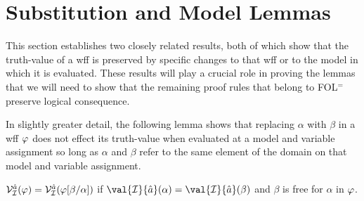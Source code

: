 \section{Substitution and Model Lemmas}%
  \label{sec:Lemmas}

This section establishes two closely related results, both of which show that the truth-value of a wff is preserved by specific changes to that wff or to the model in which it is evaluated.
These results will play a crucial role in proving the lemmas that we will need to show that the remaining proof rules that belong to FOL$^=$ preserve logical consequence.

In slightly greater detail, the following lemma shows that replacing $\alpha$ with $\beta$ in a wff $\varphi$ does not effect its truth-value when evaluated at a model and variable assignment so long as $\alpha$ and $\beta$ refer to the same element of the domain on that model and variable assignment.

\begin{Lthm} \label{lemma:sub}
  $\mathcal{V}_{\mathcal{I}}^{\hat{a}}(\varphi)=\mathcal{V}_{\mathcal{I}}^{\hat{a}}(\varphi[\beta/\alpha])$ if $\val{\I}{\va{a}}(\alpha)=\val{\I}{\va{a}}(\beta)$ and $\beta$ is free for $\alpha$ in $\varphi$.
\end{Lthm}


